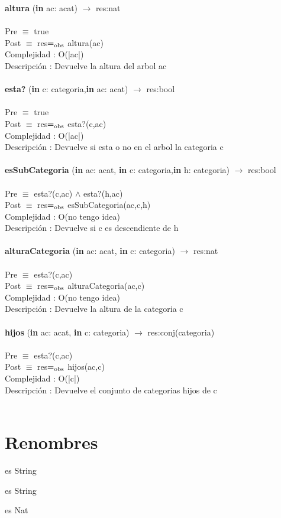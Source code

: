 \documentclass[10pt, a4paper]{article}
\begin{document}
	\textbf{altura} (\textbf{in} ac: acat) $\longrightarrow$ res:nat\\\\
	Pre $\equiv$ {true}\\
	Post $\equiv$ {res$=_{\mathrm{obs}}$ altura(ac)}\\
	Complejidad : O(|ac|)\\
	Descripci\'{o}n : Devuelve la altura del arbol ac\\\\	
	
	\textbf{esta?} (\textbf{in} c: categoria,\textbf{in} ac: acat) $\longrightarrow$ res:bool\\\\
	Pre $\equiv$ {true}\\
	Post $\equiv$ {res$=_{\mathrm{obs}}$ esta?(c,ac)}\\
	Complejidad : O(|ac|)\\
	Descripci\'{o}n : Devuelve si esta o no en el arbol la categoria c\\\\	
	
	\textbf{esSubCategoria} (\textbf{in} ac: acat, \textbf{in} c: categoria,\textbf{in} h: categoria) $\longrightarrow$ res:bool\\\\
	Pre $\equiv$ {esta?(c,ac) $\wedge$ esta?(h,ac)}\\
	Post $\equiv$ {res$=_{\mathrm{obs}}$ esSubCategoria(ac,c,h)}\\
	Complejidad : O(no tengo idea)\\
	Descripci\'{o}n : Devuelve si c es descendiente de h\\\\	
	
	\textbf{alturaCategoria} (\textbf{in} ac: acat, \textbf{in} c: categoria) $\longrightarrow$ res:nat\\\\
	Pre $\equiv$ {esta?(c,ac)}\\
	Post $\equiv$ {res$=_{\mathrm{obs}}$ alturaCategoria(ac,c)}\\
	Complejidad : O(no tengo idea)\\
	Descripci\'{o}n : Devuelve la altura de la categoria c\\\\	
	
	\textbf{hijos} (\textbf{in} ac: acat, \textbf{in} c: categoria) $\longrightarrow$ res:conj(categoria)\\\\
	Pre $\equiv$ {esta?(c,ac)}\\
	Post $\equiv$ {res$=_{\mathrm{obs}}$ hijos(ac,c)}\\
	Complejidad : O(|c|)\\
	Descripci\'{o}n : Devuelve el conjunto de categorias hijos de c\\\\	


\section{Renombres}
\begin{tad}{} es String
\end{tad}


\begin{tad}{} es String
\end{tad}

\begin{tad}{} es Nat
\end{tad}
\end{document}
